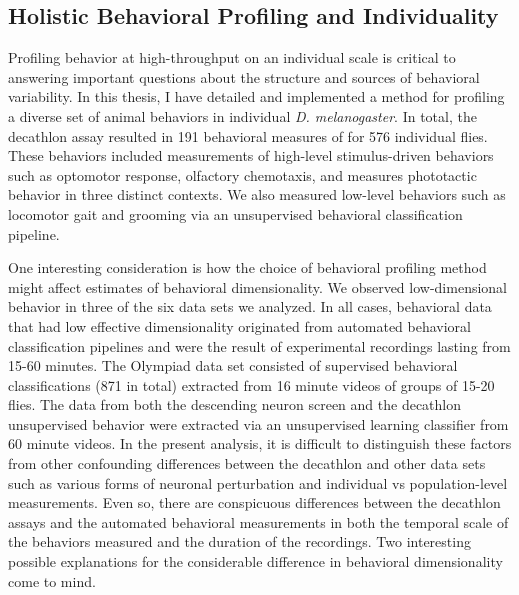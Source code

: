 \documentclass[12pt,letterpaper]{article}
\begin{document}
\subsection{Holistic Behavioral Profiling and Individuality}

Profiling behavior at high-throughput on an individual scale is critical to answering important questions about the structure and sources of behavioral variability. In this thesis, I have detailed and implemented a method for profiling a diverse set of animal behaviors in individual \textit{D. melanogaster}. In total, the decathlon assay resulted in 191 behavioral measures of for 576 individual flies. These behaviors included measurements of high-level stimulus-driven behaviors such as optomotor response, olfactory chemotaxis, and measures phototactic behavior in three distinct contexts. We also measured low-level behaviors such as locomotor gait and grooming via an unsupervised behavioral classification pipeline.
 
One interesting consideration is how the choice of behavioral profiling method might affect estimates of behavioral dimensionality. We observed low-dimensional behavior in three of the six data sets we analyzed. In all cases, behavioral data that had low effective dimensionality originated from automated behavioral classification pipelines and were the result of experimental recordings lasting from 15-60 minutes. The Olympiad data set consisted of supervised behavioral classifications (871 in total) extracted from 16 minute videos of groups of 15-20 flies. The data from both the descending neuron screen and the decathlon unsupervised behavior were extracted via an unsupervised learning classifier from 60 minute videos. In the present analysis, it is difficult to distinguish these factors from other confounding differences between the decathlon and other data sets such as various forms of neuronal perturbation and individual vs population-level measurements. Even so, there are conspicuous differences between the decathlon assays and the automated behavioral measurements in both the temporal scale of the behaviors measured and the duration of the recordings. Two interesting possible explanations for the considerable difference in behavioral dimensionality come to mind. 
\end{document}
